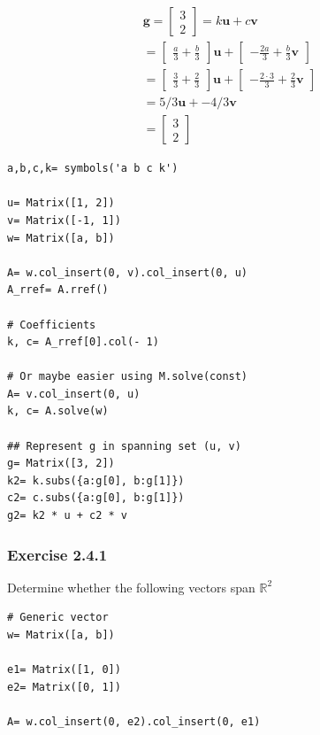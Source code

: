 \begin{align}
\mathbf{g} = \left[\begin{matrix}3\\2\end{matrix}\right]
= k\mathbf{u} + c\mathbf{v} \\
= \left[\begin{matrix}\frac{a}{3} + \frac{b}{3}\end{matrix}\right] \mathbf{u} + \left[\begin{matrix}- \frac{2 a}{3} + \frac{b}{3} \mathbf{v}\end{matrix}\right] \\
= \left[\begin{matrix}\frac{3}{3} + \frac{2}{3}\end{matrix}\right] \mathbf{u} + \left[\begin{matrix}- \frac{2 \cdot 3}{3} + \frac{2}{3} \mathbf{v}\end{matrix}\right] \\
= 5/3 \mathbf{u} + -4/3 \mathbf{v} \\
= \left[\begin{matrix}3\\2\end{matrix}\right]
\end{align}

\begin{verbatim}
a,b,c,k= symbols('a b c k')

u= Matrix([1, 2])
v= Matrix([-1, 1])
w= Matrix([a, b])

A= w.col_insert(0, v).col_insert(0, u)
A_rref= A.rref()

# Coefficients
k, c= A_rref[0].col(- 1)

# Or maybe easier using M.solve(const)
A= v.col_insert(0, u)
k, c= A.solve(w)

## Represent g in spanning set (u, v)
g= Matrix([3, 2])
k2= k.subs({a:g[0], b:g[1]})
c2= c.subs({a:g[0], b:g[1]})
g2= k2 * u + c2 * v
\end{verbatim}

\subsubsection{Exercise 2.4.1}

Determine whether the following vectors span $\mathbb{R}^2$

\begin{verbatim}
# Generic vector
w= Matrix([a, b])

e1= Matrix([1, 0])
e2= Matrix([0, 1])

A= w.col_insert(0, e2).col_insert(0, e1)
\end{verbatim}

